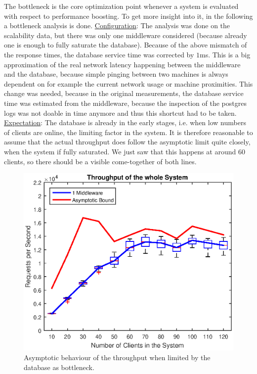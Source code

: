 \documentclass[11pt]{article}
\begin{document}
The bottleneck is the core optimization point whenever a system is evaluated with respect to performance boosting. To get more insight into it, in the following a bottleneck analysis is done.
\newline\underline{Configuration}: The analysis was done on the scalability data, but there was only one middleware considered (because already one is enough to fully saturate the database). Because of the above mismatch of the response times, the database service time was corrected by $1$ms. This is a big approximation of the real network latency happening between the middleware and the database, because simple pinging between two machines is always dependent on for example the current network usage or machine proximities. This change was needed, because in the original measurements, the database service time was estimated from the middleware, because the inspection of the postgres logs was not doable in time anymore and thus this shortcut had to be taken.
\newline\underline{Expectation}: The database is already in the early stages, i.e. when low numbers of clients are online, the limiting factor in the system. It is therefore reasonable to assume that the actual throughput does follow the asymptotic limit quite closely, when the system if fully saturated. We just saw that this happens at around 60 clients, so there should be a visible come-together of both lines.
\begin{figure}[!htb]
\centering
\includegraphics[width=0.7\linewidth]{figures/bottleneck/bottleneck}
\caption{Asymptotic behaviour of the throughput when limited by the database as bottleneck.}
\label{fig:bottleneck}
\end{figure}
\end{document}
